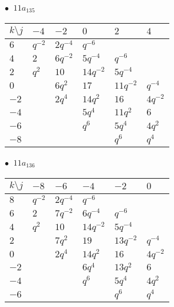 \begin{minipage}{\linewidth}
$\bullet\ $ $11a_{135}$ \vspace{0.5em} \\
\begin{tabular}{l|lllll}
$k \setminus j$ & $-4$ & $-2$ & $0$ & $2$ & $4$ \\
\hline
$6$ & $q^{-2}$ & $2q^{-4}$ & $q^{-6}$ &  &  \\
$4$ & $2$ & $6q^{-2}$ & $5q^{-4}$ & $q^{-6}$ &  \\
$2$ & $q^{2}$ & $10$ & $14q^{-2}$ & $5q^{-4}$ &  \\
$0$ &  & $6q^{2}$ & $17$ & $11q^{-2}$ & $q^{-4}$ \\
$-2$ &  & $2q^{4}$ & $14q^{2}$ & $16$ & $4q^{-2}$ \\
$-4$ &  &  & $5q^{4}$ & $11q^{2}$ & $6$ \\
$-6$ &  &  & $q^{6}$ & $5q^{4}$ & $4q^{2}$ \\
$-8$ &  &  &  & $q^{6}$ & $q^{4}$ \\
\end{tabular}
\vspace{2em}
\end{minipage}
%
\begin{minipage}{\linewidth}
$\bullet\ $ $11a_{136}$ \vspace{0.5em} \\
\begin{tabular}{l|lllll}
$k \setminus j$ & $-8$ & $-6$ & $-4$ & $-2$ & $0$ \\
\hline
$8$ & $q^{-2}$ & $2q^{-4}$ & $q^{-6}$ &  &  \\
$6$ & $2$ & $7q^{-2}$ & $6q^{-4}$ & $q^{-6}$ &  \\
$4$ & $q^{2}$ & $10$ & $14q^{-2}$ & $5q^{-4}$ &  \\
$2$ &  & $7q^{2}$ & $19$ & $13q^{-2}$ & $q^{-4}$ \\
$0$ &  & $2q^{4}$ & $14q^{2}$ & $16$ & $4q^{-2}$ \\
$-2$ &  &  & $6q^{4}$ & $13q^{2}$ & $6$ \\
$-4$ &  &  & $q^{6}$ & $5q^{4}$ & $4q^{2}$ \\
$-6$ &  &  &  & $q^{6}$ & $q^{4}$ \\
\end{tabular}
\vspace{2em}
\end{minipage}
%
